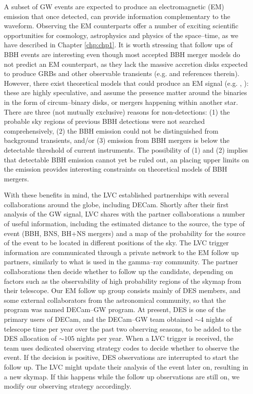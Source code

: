 A subset of GW events are expected to produce an electromagnetic (EM) emission that once detected, can provide information complementary to the waveform. Observing the EM counterparts offer a number of exciting scientific opportunities for cosmology, astrophysics and physics of the space--time, as we have described in Chapter \ref{chp:chp1}. It is worth stressing that follow ups of BBH events are interesting even though most accepted BBH merger models do not predict an EM counterpart, as they lack the massive accretion disks expected to produce GRBs and other observable transients (e.g. \citealt{2016arXiv160909517A} and references therein). However, there exist theoretical models that could produce an EM signal (e.g. \citealt{loeb}, \citealt{demink}): these are highly speculative, and assume the presence matter around the binaries in the form of circum--binary disks, or mergers happening within another star. There are three (not mutually exclusive) reasons for non-detections: (1) the probable sky regions of previous BBH detections were not searched comprehensively, (2) the BBH emission could not be distinguished from background transients, and/or (3) emission from BBH mergers is below the detectable threshold of current instruments. The possibility of (1) and (2) implies that detectable BBH emission cannot yet be ruled out, an placing upper limits on the emission provides interesting constraints on theoretical models of BBH mergers.

With these benefits in mind, the LVC established partnerships with several collaborations around the globe, including DECam. Shortly after their first analysis of the GW signal, LVC shares with the partner collaborations a number of useful information, including the estimated distance to the source, the type of event (BBH, BNS, BH+NS mergers) and a map of the probability for the source of the event to be located in different positions of the sky. The LVC trigger information are communicated through a private network to the EM follow up partners, similarly to what is used in the gamma--ray community. The partner collaborations then decide whether to follow up the candidate, depending on factors such as the observability of high probability regions of the skymap from their telescope. Our EM follow up group consists mainly of DES members, and some external collaborators from the astronomical community, so that the program was named DECam--GW program. At present, DES is one of the primary users of DECam, and the DECam--GW team obtained $\sim 4$ nights of telescope time per year over the past two observing seasons, to be added to the DES allocation of $\sim 105$ nights per year. When a LVC trigger is received, the team uses dedicated observing strategy codes to decide whether to observe the event. If the decision is positive, DES observations are interrupted to start the follow up. The LVC might update their analysis of the event later on, resulting in a new skymap. If this happens while the follow up observations are still on, we modify our observing strategy accordingly.


